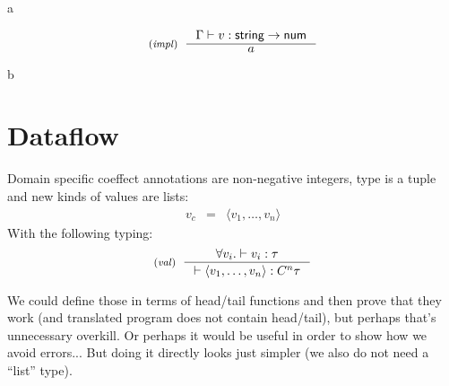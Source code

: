 \documentclass[
		twoside,openright,titlepage,numbers=noenddot,headinclude,%
                footinclude=true,cleardoublepage=empty,
                BCOR=10mm,paper=a4,fontsize=10pt, %
                ngerman,american, %
                ]{scrreprt}
\newcommand{\sep}[0]{\; | \;}
\newcommand{\ident}[1]{\textnormal{\sffamily #1}}
\newcommand{\ctyp}[2]{C^{#1}#2}
\newcommand{\tyrule}[3]{ \inference[\footnotesize{(\emph{#1})}~~]{#2}{#3} }
\newcommand{\aclrd}[1]{\textcolor{aclr}{#1}}
\newcommand{\cclrd}[1]{\textcolor{cclr}{#1}}
\newcommand{\cunit}{ \textcolor{cclr}{ \mathsf{use} } }
\begin{document}
a

\begin{equation*}
\tyrule{impl}
  { \Gamma \vdash v : \ident{string} \rightarrow \ident{num}}
  { a }
\end{equation*}

b



%




%

\section{Dataflow}
Domain specific coeffect annotations are non-negative integers, type is a tuple and new kinds
of values are lists:
\begin{equation*}
\begin{array}{rcl}
  v_c &  = &  \langle v_1, \ldots, v_n \rangle
\end{array}
\end{equation*}
%
With the following typing:
%
\begin{equation*}  
\tyrule{val}
  { \forall v_i . \vdash v_i : \tau }
  { \vdash \langle v_1, \ldots, v_n \rangle : \ctyp{n}{\tau} }
\end{equation*}
%


We could define those in terms of head/tail functions and then prove that they work (and translated
program does not contain head/tail), but perhaps that's unnecessary overkill. Or perhaps it would
be useful in order to show how we avoid errors... But doing it directly looks just simpler (we
also do not need a ``list'' type).
\end{document}
